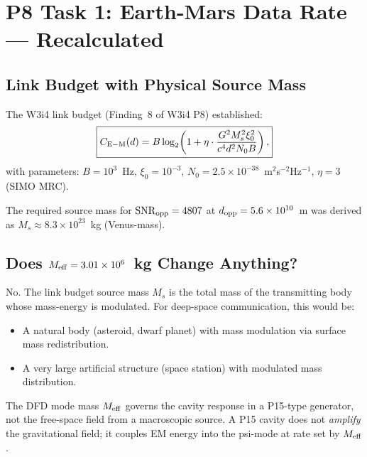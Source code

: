\documentclass[aps,prd,twocolumn,superscriptaddress,nofootinbib]{revtex4-2}
\newcommand{\SNR}{\mathrm{SNR}}
\begin{document}
\section{P8 Task 1: Earth-Mars Data Rate --- Recalculated}
\label{sec:earth-mars}

\subsection{Link Budget with Physical Source Mass}

The W3i4 link budget (Finding~8 of W3i4 P8) established:
\begin{equation}
\boxed{
C_{\rm E-M}(d) = B\log_2\!\left(1 + \eta \cdot
\frac{G^2 M_s^2 \xi_0^2}{c^4 d^2 N_0 B}\right),
}
\label{eq:link-budget}
\end{equation}
with parameters: $B = 10^3$~Hz, $\xi_0 = 10^{-3}$,
$N_0 = 2.5\times10^{-38}$~m$^2$s$^{-2}$Hz$^{-1}$, $\eta = 3$ (SIMO MRC).

The required source mass for $\SNR_{\rm opp} = 4807$ at
$d_{\rm opp} = 5.6\times10^{10}$~m was derived as
$M_s \approx 8.3\times10^{23}$~kg (Venus-mass).

\subsection{Does $M_{\rm eff} = 3.01\times10^6$~kg Change Anything?}

No. The link budget source mass $M_s$ is the total mass of the
transmitting body whose mass-energy is modulated. For deep-space
communication, this would be:
\begin{itemize}
\item A natural body (asteroid, dwarf planet) with mass modulation
  via surface mass redistribution.
\item A very large artificial structure (space station) with modulated
  mass distribution.
\end{itemize}

The DFD mode mass $M_{\rm eff}$ governs the cavity response in a
P15-type generator, not the free-space field from a macroscopic source.
A P15 cavity does not \emph{amplify} the gravitational field; it
couples EM energy into the psi-mode at rate set by $M_{\rm eff}$.
\end{document}
